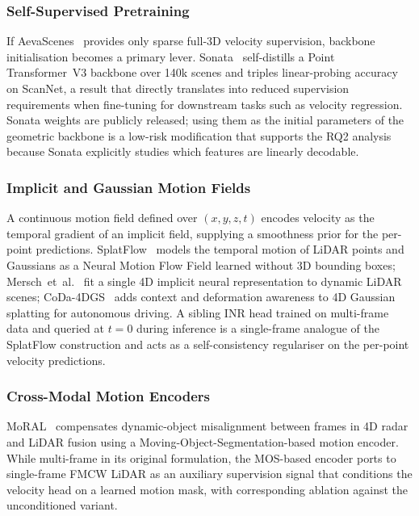 \subsubsection{Self-Supervised Pretraining}
\label{sec:new_algorithms:pretraining}

If AevaScenes~\cite{aeva2025aevascenes} provides only sparse full-3D velocity supervision, backbone initialisation becomes a primary lever. Sonata~\cite{wu2025sonata} self-distills a Point Transformer~V3 backbone over 140k scenes and triples linear-probing accuracy on ScanNet, a result that directly translates into reduced supervision requirements when fine-tuning for downstream tasks such as velocity regression. Sonata weights are publicly released; using them as the initial parameters of the geometric backbone is a low-risk modification that supports the RQ2 analysis because Sonata explicitly studies which features are linearly decodable.

\subsubsection{Implicit and Gaussian Motion Fields}
\label{sec:new_algorithms:implicit}

A continuous motion field defined over $(x, y, z, t)$ encodes velocity as the temporal gradient of an implicit field, supplying a smoothness prior for the per-point predictions. SplatFlow~\cite{sun2025splatflow} models the temporal motion of LiDAR points and Gaussians as a Neural Motion Flow Field learned without 3D bounding boxes; Mersch~et~al.~\cite{mersch2024fourdinr} fit a single 4D implicit neural representation to dynamic LiDAR scenes; CoDa-4DGS~\cite{song2025coda4dgs} adds context and deformation awareness to 4D Gaussian splatting for autonomous driving. A sibling INR head trained on multi-frame data and queried at $t = 0$ during inference is a single-frame analogue of the SplatFlow construction and acts as a self-consistency regulariser on the per-point velocity predictions.

\subsubsection{Cross-Modal Motion Encoders}
\label{sec:new_algorithms:crossmodal}

MoRAL~\cite{lin2025moral} compensates dynamic-object misalignment between frames in 4D radar and LiDAR fusion using a Moving-Object-Segmentation-based motion encoder. While multi-frame in its original formulation, the MOS-based encoder ports to single-frame FMCW LiDAR as an auxiliary supervision signal that conditions the velocity head on a learned motion mask, with corresponding ablation against the unconditioned variant.


